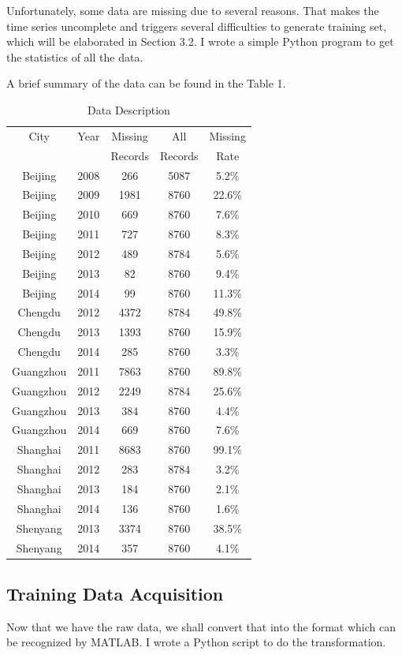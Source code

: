 \documentclass{sig-alternate}
\begin{document}
Unfortunately, some data are missing due to several reasons. That makes the time series uncomplete and triggers several difficulties to generate training set, which will be elaborated in Section 3.2. I wrote a simple Python program to get the statistics of all the data.

A brief summary of the data can be found in the Table 1.

\begin{table}[ht]
\centering
\caption{Data Description}
\begin{tabular}{|c|c|c|c|c|}  \hline
City&Year&Missing&All&Missing \\
&&Records&Records&Rate\\ \hline
Beijing&2008&266&5087&5.2\% \\ \hline
Beijing&2009&1981&8760&22.6\% \\ \hline
Beijing&2010&669&8760&7.6\% \\ \hline
Beijing&2011&727&8760&8.3\% \\ \hline
Beijing&2012&489&8784&5.6\% \\ \hline
Beijing&2013&82&8760&9.4\% \\ \hline
Beijing&2014&99&8760&11.3\% \\ \hline \hline
Chengdu&2012&4372&8784&49.8\% \\ \hline
Chengdu&2013&1393&8760&15.9\% \\ \hline
Chengdu&2014&285&8760&3.3\% \\ \hline \hline
Guangzhou&2011&7863&8760&89.8\% \\ \hline
Guangzhou&2012&2249&8784&25.6\% \\ \hline
Guangzhou&2013&384&8760&4.4\% \\ \hline
Guangzhou&2014&669&8760&7.6\% \\ \hline \hline
Shanghai&2011&8683&8760&99.1\% \\ \hline
Shanghai&2012&283&8784&3.2\% \\ \hline
Shanghai&2013&184&8760&2.1\% \\ \hline
Shanghai&2014&136&8760&1.6\% \\ \hline \hline
Shenyang&2013&3374&8760&38.5\% \\ \hline
Shenyang&2014&357&8760&4.1\% \\ \hline \hline
\end{tabular}
\end{table}

\subsection{Training Data Acquisition}
Now that we have the raw data, we shall convert that into the format which can be recognized by MATLAB. I wrote a Python script to do the transformation.
\end{document}
